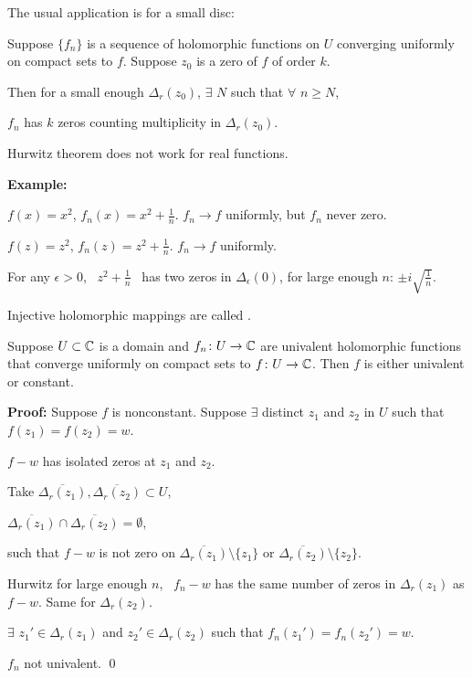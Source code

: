 \documentclass[10pt,aspectratio=169]{beamer}
\begin{document}
\begin{frame}
The usual application is for a small disc:

\medskip
\pause

Suppose $\{ f_n \}$ is a sequence of holomorphic
functions on $U$ converging uniformly
on compact sets to $f$.
\pause
Suppose $z_0$ is a zero of
$f$ of order $k$.

\medskip
\pause
Then for a small enough $\Delta_r(z_0)$,
$\exists$ $N$ such that
$\forall$ $n \geq N$,

$f_n$ has $k$ zeros counting multiplicity in
$\Delta_r(z_0)$.

\bigskip
\pause

Hurwitz theorem does not work for real functions.

\medskip
\pause

\textbf{Example:}

$f(x) = x^2$, \quad $f_n(x) = x^2+\frac{1}{n}$.  \quad $f_n \to f$ uniformly, but
$f_n$ never zero.

\medskip
\pause

$f(z) = z^2$, \quad $f_n(z) = z^2+\frac{1}{n}$.  \quad $f_n \to f$ uniformly.

\pause
\medskip

For any $\epsilon > 0$, ~$z^2+\frac{1}{n}$~ has
two zeros in $\Delta_\epsilon(0)$, for large enough $n$:
\quad
$\pm i \sqrt{\frac{1}{n}}$.
\end{frame}

\begin{frame}
Injective holomorphic
mappings are called \emph{}.

\pause

\begin{corollary}
Suppose $U \subset {\mathbb{C}}$ is a domain and $f_n \colon U \to {\mathbb{C}}$ are
univalent holomorphic functions that converge uniformly on compact sets
to $f \colon U \to {\mathbb{C}}$.  Then $f$ is either univalent or constant.
\end{corollary}

\pause
\textbf{Proof:}
Suppose $f$ is nonconstant.
\pause
Suppose $\exists$ distinct $z_1$ and $z_2$ in $U$ such that $f(z_1) =
f(z_2) = w$.

\pause
\medskip

$f-w$ has isolated zeros at $z_1$ and $z_2$.

\medskip
\pause
Take $\overline{\Delta_r(z_1)},\overline{\Delta_r(z_2)} \subset U$,

\pause
$\overline{\Delta_r(z_1)} \cap \overline{\Delta_r(z_2)} = \emptyset$,

\pause 
such that $f-w$ is not zero on
$\overline{\Delta_r(z_1)} \setminus \{ z_1 \}$ or
$\overline{\Delta_r(z_2)} \setminus \{ z_2 \}$.

\medskip
\pause

Hurwitz \wthus for large enough $n$, ~$f_n-w$ has the same number of
zeros in $\Delta_r(z_1)$ as $f-w$. \pause Same for $\Delta_r(z_2)$.

\pause
\medskip
\thus \quad $\exists$ $z_1' \in \Delta_r(z_1)$ and
$z_2' \in \Delta_r(z_2)$ such that $f_n(z_1')=f_n(z_2')=w$.

\pause
\medskip

\thus \quad
$f_n$ not univalent. \qed
\end{frame}
\end{document}
